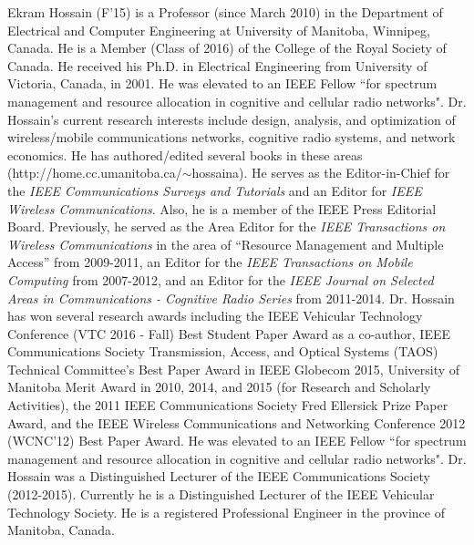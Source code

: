 \documentclass[twocolumn,10pt]{IEEEtran}
\begin{document}
\newpage
\begin{IEEEbiography} 
{Ekram Hossain} (F'15) is a Professor (since March 2010) in the Department of Electrical and Computer Engineering at University of Manitoba, Winnipeg, Canada. He is a Member (Class of 2016) of the College of the Royal Society of Canada. He received his Ph.D. in Electrical Engineering from University of Victoria, Canada, in 2001. He was elevated to an IEEE Fellow ``for spectrum management and  resource allocation in  cognitive and cellular radio networks".  Dr. Hossain's current research interests include design, analysis, and optimization of wireless/mobile communications networks, cognitive radio systems, and network economics.  He has authored/edited several books in these areas (http://home.cc.umanitoba.ca/$\sim$hossaina). He  serves as the Editor-in-Chief for the {\em IEEE Communications Surveys and Tutorials}  and an Editor for  {\em IEEE Wireless Communications}.  Also, he is a member of the IEEE Press Editorial Board. Previously, he served as the Area Editor for the {\em IEEE Transactions on Wireless Communications} in the area of  ``Resource Management and Multiple Access'' from 2009-2011, an Editor for the {\em IEEE Transactions on Mobile Computing} from 2007-2012, and an Editor for the {\em IEEE Journal on Selected Areas in Communications - Cognitive Radio Series} from 2011-2014. Dr. Hossain has won several research awards including the IEEE Vehicular Technology Conference (VTC 2016 - Fall) Best Student Paper Award as a co-author,  IEEE Communications Society Transmission, Access, and Optical Systems (TAOS) Technical Committee's Best Paper Award in IEEE Globecom 2015, University of Manitoba Merit Award in 2010, 2014, and 2015 (for Research and Scholarly Activities), the 2011 IEEE Communications Society Fred Ellersick Prize Paper Award, and the IEEE Wireless Communications and Networking Conference 2012 (WCNC'12) Best Paper Award. He was elevated to an IEEE Fellow ``for spectrum management and  resource allocation in  cognitive and cellular radio networks".  Dr. Hossain was a Distinguished Lecturer of the IEEE Communications Society (2012-2015). Currently he is a  Distinguished Lecturer of the IEEE Vehicular Technology Society. He is a registered Professional Engineer in the province of Manitoba, Canada.
\end{IEEEbiography}
\end{document}
